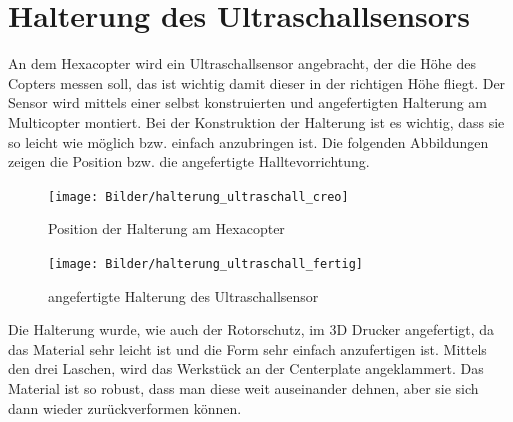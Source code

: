 \section{Halterung des Ultraschallsensors}
An dem Hexacopter wird ein Ultraschallsensor angebracht, der die Höhe des Copters messen soll, das ist wichtig damit dieser in der richtigen Höhe fliegt. Der Sensor wird mittels einer selbst konstruierten und angefertigten Halterung am Multicopter montiert.
Bei der Konstruktion der Halterung ist es wichtig, dass sie so leicht wie möglich bzw. einfach anzubringen ist. Die folgenden Abbildungen zeigen die Position bzw. die angefertigte Halltevorrichtung.

\begin{figure}[htb]
\begin{centering}
\texttt{[image: Bilder/halterung\_ultraschall\_creo]}
\par\end{centering}
\caption{Position der Halterung am Hexacopter}
\label{Halterung des Ultraschallsensor}
\end{figure}

\begin{figure}[htb]
\begin{centering}
\texttt{[image: Bilder/halterung\_ultraschall\_fertig]}
\par\end{centering}
\caption{angefertigte Halterung des Ultraschallsensor}
\label{Halterung des Ultraschallsensor}
\end{figure}

Die Halterung wurde, wie auch der Rotorschutz, im 3D Drucker angefertigt, da das Material sehr leicht ist und die Form sehr einfach anzufertigen ist. Mittels den drei Laschen, wird das Werkstück an der Centerplate angeklammert.
Das Material ist so robust, dass man diese weit auseinander dehnen, aber sie sich dann wieder zurückverformen können. 


